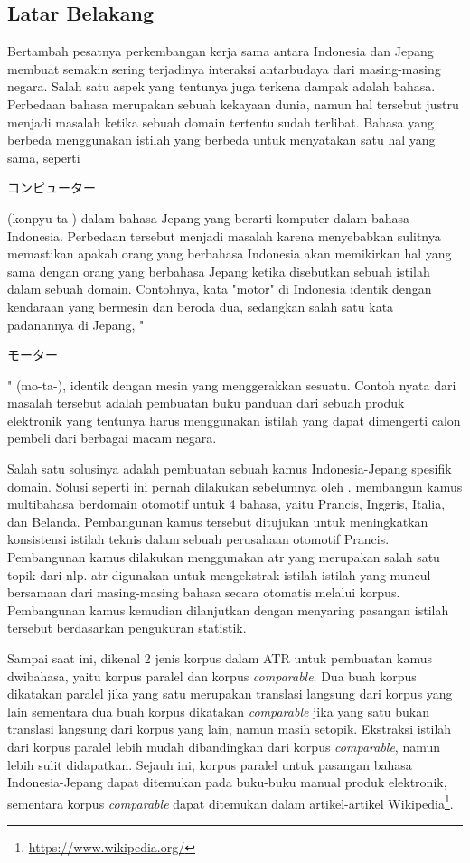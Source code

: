 \documentclass[../main/main.tex]{subfiles}
\begin{document}

\subsection{Latar Belakang}
Bertambah pesatnya perkembangan kerja sama antara Indonesia dan Jepang membuat semakin sering terjadinya interaksi antarbudaya dari masing-masing negara. Salah satu aspek yang tentunya juga terkena dampak adalah bahasa. Perbedaan bahasa merupakan sebuah kekayaan dunia, namun hal tersebut justru menjadi masalah ketika sebuah domain tertentu sudah terlibat. Bahasa yang berbeda menggunakan istilah yang berbeda untuk menyatakan satu hal yang sama, seperti \begin{CJK}{UTF8}{min}コンピューター\end{CJK} (konpyu-ta-) dalam bahasa Jepang yang berarti komputer dalam bahasa Indonesia. Perbedaan tersebut menjadi masalah karena menyebabkan sulitnya memastikan apakah orang yang berbahasa Indonesia akan memikirkan hal yang sama dengan orang yang berbahasa Jepang ketika disebutkan sebuah istilah dalam sebuah domain. Contohnya, kata "motor" di Indonesia identik dengan kendaraan yang bermesin dan beroda dua, sedangkan salah satu kata padanannya di Jepang, "\begin{CJK}{UTF8}{min}モーター\end{CJK}" (mo-ta-), identik dengan mesin yang menggerakkan sesuatu. Contoh nyata dari masalah tersebut adalah pembuatan buku panduan dari sebuah produk elektronik yang tentunya harus menggunakan istilah yang dapat dimengerti calon pembeli dari berbagai macam negara.

Salah satu solusinya adalah pembuatan sebuah kamus Indonesia-Jepang spesifik domain. Solusi seperti ini pernah dilakukan sebelumnya oleh \textcite{lefever}. \textcite{lefever} membangun kamus multibahasa berdomain otomotif untuk 4 bahasa, yaitu Prancis, Inggris, Italia, dan Belanda. Pembangunan kamus tersebut ditujukan untuk meningkatkan konsistensi istilah teknis dalam sebuah perusahaan otomotif Prancis. Pembangunan kamus dilakukan menggunakan \gls{atr} yang merupakan salah satu topik dari \gls{nlp}. \Gls{atr} digunakan untuk mengekstrak istilah-istilah yang muncul bersamaan dari masing-masing bahasa secara otomatis melalui \gls{korpus}. Pembangunan kamus kemudian dilanjutkan dengan menyaring pasangan istilah tersebut berdasarkan pengukuran statistik.

Sampai saat ini, dikenal 2 jenis korpus dalam ATR untuk pembuatan kamus dwibahasa, yaitu \parencite{koehn} korpus paralel dan korpus \textit{comparable}. Dua buah korpus dikatakan paralel jika yang satu merupakan translasi langsung dari korpus yang lain sementara dua buah korpus dikatakan \textit{comparable} jika yang satu bukan translasi langsung dari korpus yang lain, namun masih setopik. Ekstraksi istilah dari korpus paralel lebih mudah dibandingkan dari korpus \textit{comparable}, namun lebih sulit didapatkan. Sejauh ini, korpus paralel untuk pasangan bahasa Indonesia-Jepang dapat ditemukan pada buku-buku manual produk elektronik, sementara korpus \textit{comparable} dapat ditemukan dalam artikel-artikel Wikipedia\footnote{\url{https://www.wikipedia.org/}}.
\end{document}
